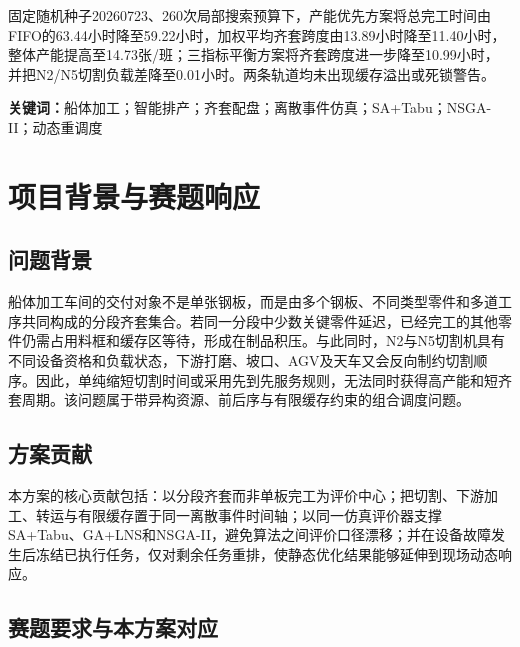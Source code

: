 \documentclass[UTF8,zihao=-4,openany]{ctexrep}
\begin{document}
固定随机种子20260723、260次局部搜索预算下，产能优先方案将总完工时间由FIFO的63.44小时降至59.22小时，加权平均齐套跨度由13.89小时降至11.40小时，整体产能提高至14.73张/班；三指标平衡方案将齐套跨度进一步降至10.99小时，并把N2/N5切割负载差降至0.01小时。两条轨道均未出现缓存溢出或死锁警告。

\noindent\textbf{关键词：}船体加工；智能排产；齐套配盘；离散事件仿真；SA+Tabu；NSGA-II；动态重调度

\tableofcontents
\clearpage
{}

\chapter{项目背景与赛题响应}

\section{问题背景}

船体加工车间的交付对象不是单张钢板，而是由多个钢板、不同类型零件和多道工序共同构成的分段齐套集合。若同一分段中少数关键零件延迟，已经完工的其他零件仍需占用料框和缓存区等待，形成在制品积压。与此同时，N2与N5切割机具有不同设备资格和负载状态，下游打磨、坡口、AGV及天车又会反向制约切割顺序。因此，单纯缩短切割时间或采用先到先服务规则，无法同时获得高产能和短齐套周期。该问题属于带异构资源、前后序与有限缓存约束的组合调度问题\cite{pinedo}。

\section{方案贡献}

本方案的核心贡献包括：以分段齐套而非单板完工为评价中心；把切割、下游加工、转运与有限缓存置于同一离散事件时间轴；以同一仿真评价器支撑SA+Tabu、GA+LNS和NSGA-II，避免算法之间评价口径漂移；并在设备故障发生后冻结已执行任务，仅对剩余任务重排，使静态优化结果能够延伸到现场动态响应。

\section{赛题要求与本方案对应}
\end{document}
